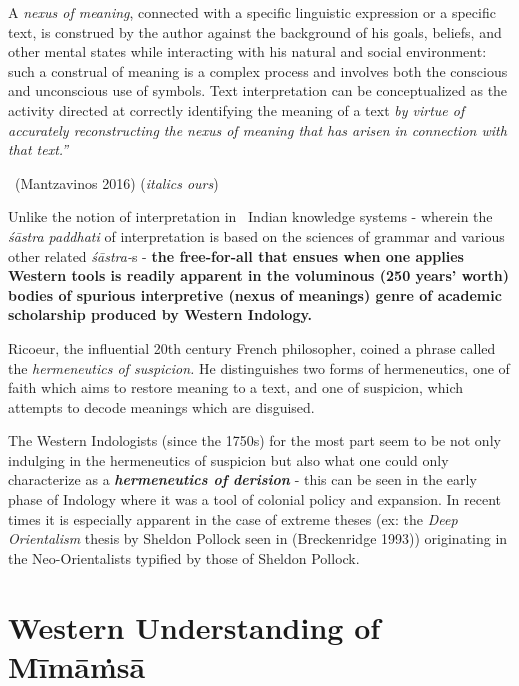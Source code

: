 \begin{myquote}
A \textit{nexus of meaning}, connected with a specific linguistic expression or a specific text, is construed by the author against the background of his goals, beliefs, and other mental states while interacting with his natural and social environment: such a construal of meaning is a complex process and involves both the conscious and unconscious use of symbols. Text interpretation can be conceptualized as the activity directed at correctly identifying the meaning of a text \textit{by virtue of accurately reconstructing the nexus of meaning that has arisen in connection with that text.” }

~\hfill (Mantzavinos 2016) (\textit{italics ours})
\end{myquote}

Unlike the notion of interpretation in  Indian knowledge systems - wherein the \textit{śāstra paddhati} of interpretation is based on the sciences of grammar and various other related \textit{śāstra-}s - \textbf{the free-for-all that ensues when one applies Western tools is readily apparent in the voluminous (250 years’ worth) bodies of spurious interpretive (nexus of meanings) genre of academic scholarship produced by Western Indology.}

Ricoeur, the influential 20th century French philosopher, coined a phrase called the \textit{hermeneutics of suspicion.} He distinguishes two forms of hermeneutics, one of faith which aims to restore meaning to a text, and one of suspicion, which attempts to decode meanings which are disguised.

The Western Indologists (since the 1750s) for the most part seem to be not only indulging in the hermeneutics of suspicion but also what one could only characterize as a \textbf{\textit{hermeneutics of derision}} - this can be seen in the early phase of Indology where it was a tool of colonial policy and expansion. In recent times it is especially apparent in the case of extreme theses (ex: the \textit{Deep Orientalism} thesis by Sheldon Pollock seen in (Breckenridge 1993)) originating in the Neo-Orientalists typified by those of Sheldon Pollock.


\section*{Western Understanding of Mīmāṁsā}

